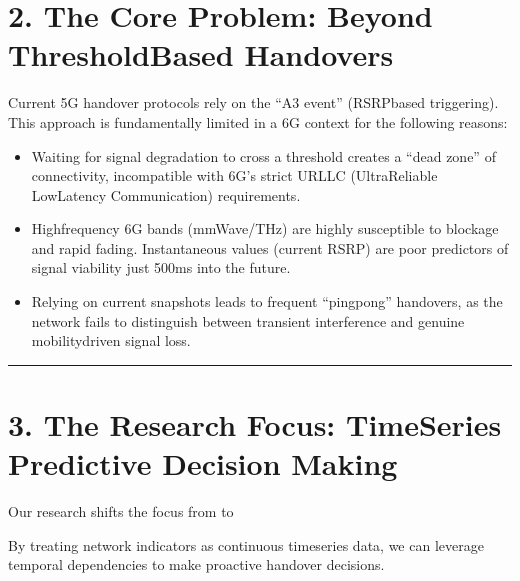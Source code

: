 \documentclass[letterpaper,10pt,english]{sphinxmanual}
\begin{document}
\section{2. The Core Problem: Beyond Threshold\sphinxhyphen{}Based Handovers}
\label{\detokenize{overview:the-core-problem-beyond-threshold-based-handovers}}
\sphinxAtStartPar
Current 5G handover protocols rely on the “A3 event” (RSRP\sphinxhyphen{}based triggering). This approach is fundamentally limited in a 6G context for the following reasons:
\begin{itemize}
\item {} 
\sphinxAtStartPar
{} Waiting for signal degradation to cross a threshold creates a “dead zone” of connectivity, incompatible with 6G’s strict URLLC (Ultra\sphinxhyphen{}Reliable Low\sphinxhyphen{}Latency Communication) requirements.

\item {} 
\sphinxAtStartPar
{} High\sphinxhyphen{}frequency 6G bands (mmWave/THz) are highly susceptible to blockage and rapid fading. Instantaneous values (current RSRP) are poor predictors of signal viability just 500ms into the future.

\item {} 
\sphinxAtStartPar
{} Relying on current snapshots leads to frequent “ping\sphinxhyphen{}pong” handovers, as the network fails to distinguish between transient interference and genuine mobility\sphinxhyphen{}driven signal loss.

\end{itemize}


\bigskip\hrule\bigskip



\section{3. The Research Focus: Time\sphinxhyphen{}Series Predictive Decision Making}
\label{\detokenize{overview:the-research-focus-time-series-predictive-decision-making}}
\sphinxAtStartPar
Our research shifts the focus from  to 

\sphinxAtStartPar
By treating network indicators as continuous time\sphinxhyphen{}series data, we can leverage temporal dependencies to make proactive handover decisions.
\end{document}
